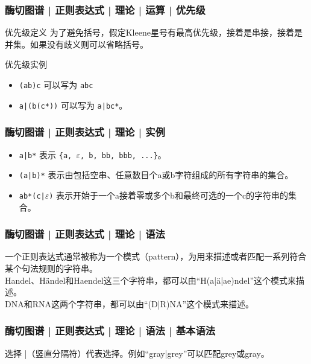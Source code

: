 \begin{frame}[fragile]
  \frametitle{酶切图谱 | 正则表达式 | 理论 | 运算 | \alert{优先级}}
  \begin{block}{优先级定义}
    为了避免括号，假定Kleene星号有最高优先级，接着是串接，接着是并集。如果没有歧义则可以省略括号。
  \end{block}
  \pause
  \begin{block}{优先级实例}
    \begin{itemize}
      \item \verb|(ab)c| 可以写为 \verb|abc|
      \item \verb=a|(b(c*))= 可以写为 \verb=a|bc*=。
    \end{itemize}
  \end{block}
\end{frame}

\begin{frame}[fragile]
  \frametitle{酶切图谱 | 正则表达式 | 理论 | 实例}
  \begin{itemize}
    \item \verb=a|b*= 表示 \verb={a, =$\varepsilon$\verb=, b, bb, bbb, ...}=。
    \item \verb=(a|b)*= 表示由包括空串、任意数目个a或b字符组成的所有字符串的集合。
    \item \verb=ab*(c|=$\varepsilon$\verb=)= 表示开始于一个a接着零或多个b和最终可选的一个c的字符串的集合。
  \end{itemize}
\end{frame}

\begin{frame}[fragile]
  \frametitle{酶切图谱 | 正则表达式 | 理论 | 语法}
  \alert{一个正则表达式通常被称为一个模式（pattern），为用来描述或者匹配一系列符合某个句法规则的字符串。}\\
  \vspace{1em}
  Handel、Händel和Haendel这三个字符串，都可以由“H(a|ä|ae)ndel”这个模式来描述。\\
  \vspace{1em}
  DNA和RNA这两个字符串，都可以由“(D|R)NA”这个模式来描述。
\end{frame}

\begin{frame}
  \frametitle{酶切图谱 | 正则表达式 | 理论 | 语法 | \alert{基本语法}}
  \begin{block}{选择}
    |（竖直分隔符）代表选择。例如“gray|grey”可以匹配grey或gray。
  \end{block}
\end{frame}

